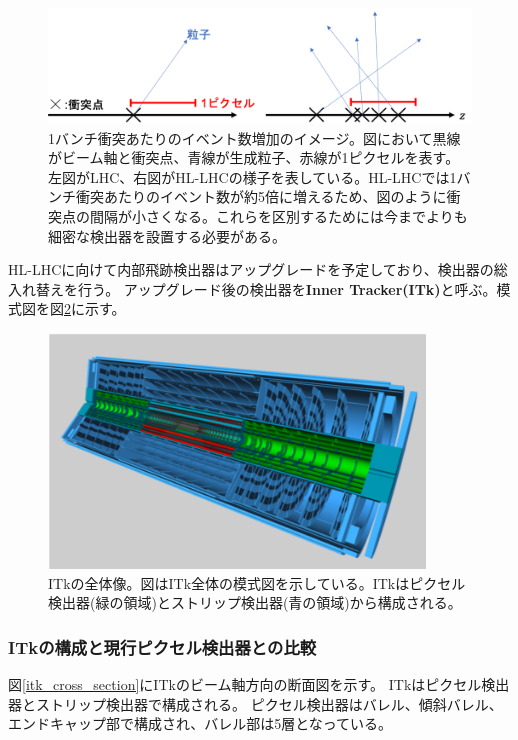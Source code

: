 \begin{figure}[bpt]\centering
\includegraphics[width=12cm]{./detector_posi_res.png}
\caption[1バンチ衝突あたりのイベント数増加のイメージ]{1バンチ衝突あたりのイベント数増加のイメージ。図において黒線がビーム軸と衝突点、青線が生成粒子、赤線が1ピクセルを表す。左図がLHC、右図がHL-LHCの様子を表している。HL-LHCでは1バンチ衝突あたりのイベント数が約5倍に増えるため、図のように衝突点の間隔が小さくなる。これらを区別するためには今までよりも細密な検出器を設置する必要がある。}
\label{detector_posi_res}
\end{figure}

HL-LHCに向けて内部飛跡検出器はアップグレードを予定しており、検出器の総入れ替えを行う。
アップグレード後の検出器を\textbf{Inner Tracker(ITk)}と呼ぶ。模式図を図\ref{itk_image}に示す。

\begin{figure}[bpt]\centering
\includegraphics[width=10cm]{./itk_image.png}
\caption[ITkの全体像]{ITkの全体像\cite{1-3}。図はITk全体の模式図を示している。ITkはピクセル検出器(緑の領域)とストリップ検出器(青の領域)から構成される。}
\label{itk_image}
\end{figure}

\subsubsection{ITkの構成と現行ピクセル検出器との比較}
図\ref{itk_cross_section}にITkのビーム軸方向の断面図を示す。
ITkはピクセル検出器とストリップ検出器で構成される。
ピクセル検出器はバレル、傾斜バレル、エンドキャップ部で構成され、バレル部は5層となっている。

